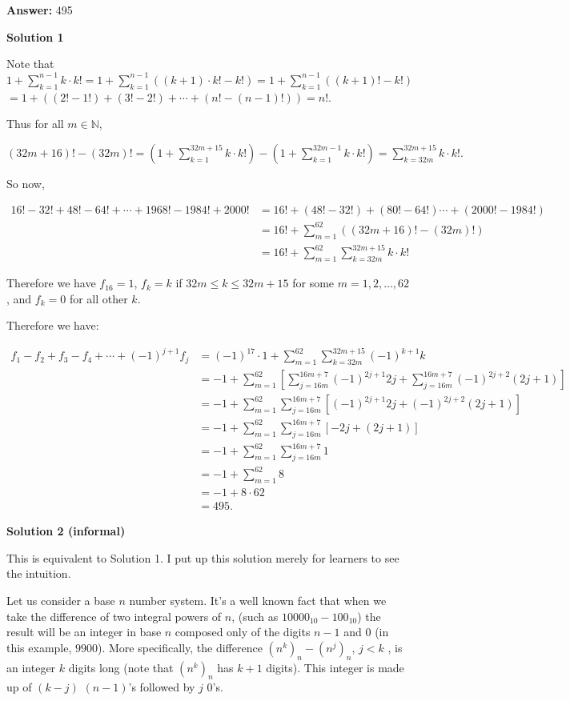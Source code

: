 \begin{enumerate}
 
 \textbf{Answer: }495



\textbf{Solution 1}

Note that $1+\sum_{k=1}^{n-1} {k\cdot k!} = 1+\sum_{k=1}^{n-1} {((k+1) \cdot k!- k!)} = 1+\sum_{k=1}^{n-1} {((k+1)!- k!)}$
$= 1 + ((2! - 1!) + (3! - 2!) + \cdots + (n! - (n-1)!)) = n!$.

 Thus for all $m\in\mathbb{N}$,

 $(32m+16)!-(32m)! = \left(1+\sum_{k=1}^{32m+15} {k\cdot k!}\right)-\left(1+\sum_{k=1}^{32m-1} {k\cdot k!}\right) = \sum_{k=32m}^{32m+15}k\cdot k!.$

 So now,

 
 \begin{align*} 16!-32!+48!-64!+\cdots+1968!-1984!+2000!&=16!+(48!-32!)+(80!-64!)\cdots+(2000!-1984!)\\ &=16! +\sum_{m=1}^{62}\left((32m+16)!-(32m)!\right)\\ &=16! +\sum_{m=1}^{62}\sum_{k=32m}^{32m+15}k\cdot k! \end{align*}


 Therefore we have $f_{16} = 1$, $f_k=k$ if $32m\le k \le 32m+15$ for some $m=1,2,\ldots,62$, and $f_k = 0$ for all other $k$.

 Therefore we have:

 
 \begin{align*} f_1-f_2+f_3-f_4+\cdots+(-1)^{j+1}f_j &= (-1)^{17}\cdot 1 + \sum_{m=1}^{62}\sum_{k=32m}^{32m+15}(-1)^{k+1}k\\ &= -1 + \sum_{m=1}^{62}\left[\sum_{j=16m}^{16m+7}(-1)^{2j+1}2j+\sum_{j=16m}^{16m+7}(-1)^{2j+2}(2j+1)\right]\\ &= -1 + \sum_{m=1}^{62}\sum_{j=16m}^{16m+7}[(-1)^{2j+1}2j+(-1)^{2j+2}(2j+1)]\\ &= -1 + \sum_{m=1}^{62}\sum_{j=16m}^{16m+7}[-2j+(2j+1)]\\ &= -1 + \sum_{m=1}^{62}\sum_{j=16m}^{16m+7}1\\ &= -1 + \sum_{m=1}^{62}8\\ &= -1 + 8\cdot 62\\ &= \boxed{495}. \end{align*}





\textbf{Solution 2 (informal)}

This is equivalent to Solution 1. I put up this solution merely for learners to see the intuition.

 Let us consider a base $n$ number system. It’s a well known fact that when we take the difference of two integral powers of $n$, (such as $10000_{10} - 100_{10}$) the result will be an integer in base $n$ composed only of the digits $n - 1$ and $0$ (in this example, $9900$). More specifically, the difference $(n^k)_n - (n^j)_n$, $j<k$ , is an integer $k$ digits long (note that $(n^k)_n$ has $k + 1$ digits). This integer is made up of $(k-j)$ $(n - 1)$’s followed by $j$ $0$’s.


\end{enumerate}
